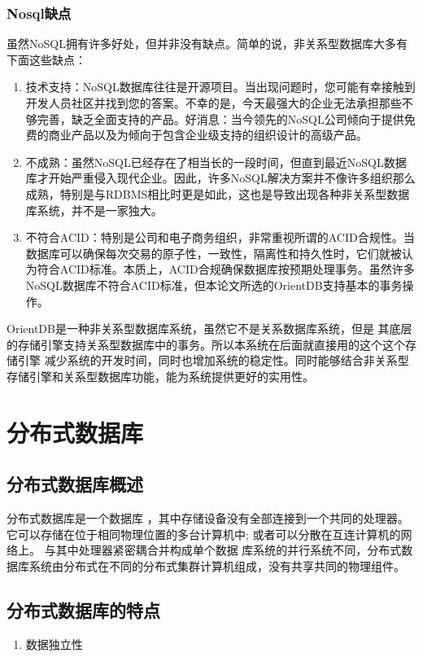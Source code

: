 \subsubsection{Nosql缺点}
虽然NoSQL拥有许多好处，但并非没有缺点。简单的说，非关系型数据库大多有下面这些缺点：
\begin{enumerate}
	\item 技术支持：NoSQL数据库往往是开源项目。当出现问题时，您可能有幸接触到开发人员社区并找到您的答案。不幸的是，今天最强大的企业无法承担那些不够完善，缺乏全面支持的产品。好消息：当今领先的NoSQL公司倾向于提供免费的商业产品以及为倾向于包含企业级支持的组织设计的高级产品。
\item 	不成熟：虽然NoSQL已经存在了相当长的一段时间，但直到最近NoSQL数据库才开始严重侵入现代企业。因此，许多NoSQL解决方案并不像许多组织那么成熟，特别是与RDBMS相比时更是如此，这也是导致出现各种非关系型数据库系统，并不是一家独大。
\item 	不符合ACID：特别是公司和电子商务组织，非常重视所谓的ACID合规性。当数据库可以确保每次交易的原子性，一致性，隔离性和持久性时，它们就被认为符合ACID标准。本质上，ACID合规确保数据库按预期处理事务。虽然许多NoSQL数据库不符合ACID标准，但本论文所选的OrientDB支持基本的事务操作。
\end{enumerate}


OrientDB是一种非关系型数据库系统，虽然它不是关系数据库系统，但是
其底层的存储引擎支持关系型数据库中的事务。所以本系统在后面就直接用的这个这个存储引擎
减少系统的开发时间，同时也增加系统的稳定性。同时能够结合非关系型存储引擎和关系型数据库功能，能为系统提供更好的实用性。
\section{分布式数据库}
\subsection{分布式数据库概述}
分布式数据库是一个数据库
，其中存储设备没有全部连接到一个共同的处理器。
它可以存储在位于相同物理位置的多台计算机中; 
或者可以分散在互连计算机的网络上。
与其中处理器紧密耦合并构成单个数据
库系统的并行系统不同，分布式数据库系统由分布式在不同的分布式集群计算机组成，没有共享共同的物理组件。
\subsection{分布式数据库的特点}

	\begin{enumerate}
		\item 数据独立性
	\end{enumerate}


